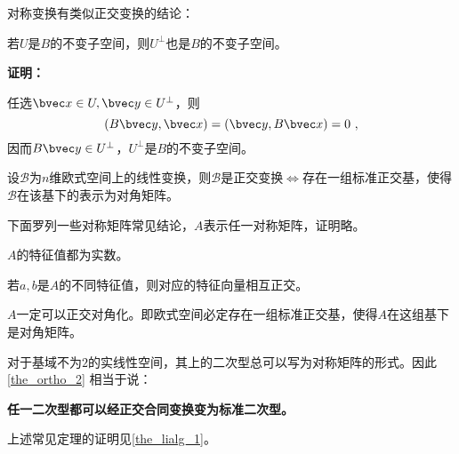对称变换有类似正交变换的结论：
\begin{theorem}{}
若$U$是$B$的不变子空间，则$U^{\bot}$也是$B$的不变子空间。
\end{theorem}
\textbf{证明：}

任选$\bvec x\in U,\bvec y\in U^{\bot}$，则
\begin{equation}
(B\bvec y,\bvec x)=(\bvec y,B\bvec x)=0~,
\end{equation}
因而$B\bvec y\in U^{\bot}$，$ U^{\bot}$是$B$的不变子空间。
\begin{exercise}{}
设$\mathcal B$为$n$维欧式空间上的线性变换，则$\mathcal B$是正交变换$\Longleftrightarrow$存在一组标准正交基，使得$\mathcal B$在该基下的表示为对角矩阵。
\end{exercise}
下面罗列一些对称矩阵常见结论，$A$表示任一对称矩阵，证明略。
\begin{theorem}{}
$A$的特征值都为实数。
\end{theorem}
\begin{theorem}{}
若$a,b$是$A$的不同特征值，则对应的特征向量相互正交。
\end{theorem}
\begin{theorem}{}\label{the_ortho_2}
$A$一定可以正交对角化。即欧式空间必定存在一组标准正交基，使得$A$在这组基下是对角矩阵。
\end{theorem}
对于基域不为$2$的实线性空间，其上的二次型总可以写为对称矩阵的形式。因此\autoref{the_ortho_2} 相当于说：

\textbf{任一二次型都可以经正交合同变换变为标准二次型。}

上述常见定理的证明见\autoref{the_lialg_1}。